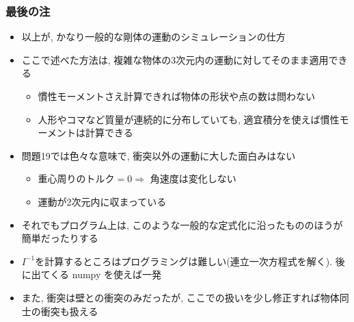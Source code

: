 \documentclass[10pt,dvipdfmx]{beamer}
\begin{document}
\begin{frame}[fragile]
\frametitle{最後の注}

\begin{itemize}
\item 以上が, かなり一般的な剛体の運動のシミュレーションの仕方

\item ここで述べた方法は, 複雑な物体の3次元内の運動に対してそのまま適用できる
  \begin{itemize}
  \item 慣性モーメントさえ計算できれば物体の形状や点の数は問わない
  \item 人形やコマなど質量が連続的に分布していても,
    適宜積分を使えば慣性モーメントは計算できる
  \end{itemize}

\item 問題19では色々な意味で, 衝突以外の運動に大した面白みはない
  \begin{itemize}
  \item 重心周りのトルク$=0 \Rightarrow$ 角速度は変化しない
  \item 運動が2次元内に収まっている
  \end{itemize}

\item それでもプログラム上は, 
  このような一般的な定式化に沿ったもののほうが簡単だったりする

\item $I^{-1}$を計算するところはプログラミングは難しい(連立一次方程式を解く). 
  後に出てくる numpy を使えば一発

\item また, 衝突は壁との衝突のみだったが, 
  ここでの扱いを少し修正すれば物体同士の衝突も扱える
\end{itemize}
\end{frame}
\end{document}
